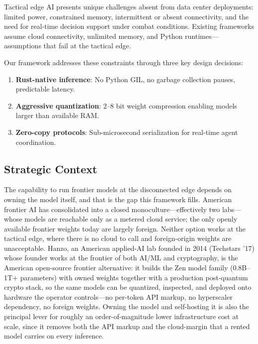 \documentclass[11pt,letterpaper]{article}
\begin{document}
Tactical edge AI presents unique challenges absent from data center deployments: limited power, constrained memory, intermittent or absent connectivity, and the need for real-time decision support under combat conditions. Existing frameworks assume cloud connectivity, unlimited memory, and Python runtimes---assumptions that fail at the tactical edge.

Our framework addresses these constraints through three key design decisions:
\begin{enumerate}
\item \textbf{Rust-native inference}: No Python GIL, no garbage collection pauses, predictable latency.
\item \textbf{Aggressive quantization}: 2--8 bit weight compression enabling models larger than available RAM.
\item \textbf{Zero-copy protocols}: Sub-microsecond serialization for real-time agent coordination.
\end{enumerate}

\subsection{Strategic Context}

The capability to run frontier models at the disconnected edge depends on owning the model itself, and that is the gap this framework fills. American frontier AI has consolidated into a closed monoculture---effectively two labs---whose models are reachable only as a metered cloud service; the only openly available frontier weights today are largely foreign. Neither option works at the tactical edge, where there is no cloud to call and foreign-origin weights are unacceptable. Hanzo, an American applied-AI lab founded in 2014 (Techstars '17) whose founder works at the frontier of both AI/ML and cryptography, is the American open-source frontier alternative: it builds the Zen model family (0.8B--1T+ parameters) with owned weights together with a production post-quantum crypto stack, so the same models can be quantized, inspected, and deployed onto hardware the operator controls---no per-token API markup, no hyperscaler dependency, no foreign weights. Owning the model and self-hosting it is also the principal lever for roughly an order-of-magnitude lower infrastructure cost at scale, since it removes both the API markup and the cloud-margin that a rented model carries on every inference.

\end{document}
